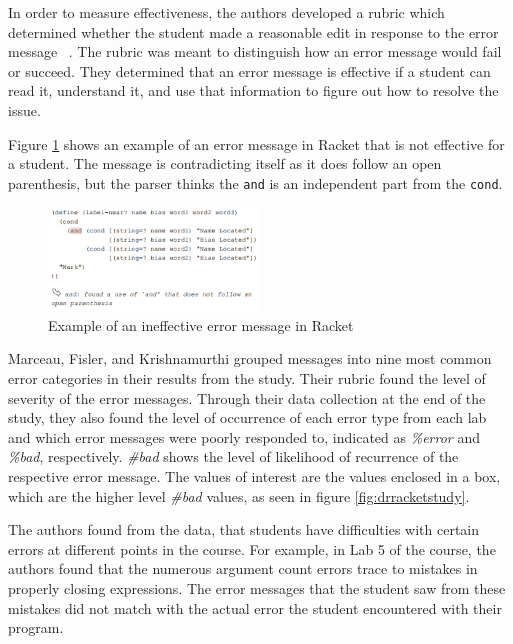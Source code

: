 \documentclass{sig-alternate}
\begin{document}
In order to measure effectiveness, the authors developed a rubric which determined whether the student made a reasonable edit in response to the error message ~\cite{Marceau:2011:MEE:1953163.1953308}. The rubric was meant to distinguish how an error message would fail or succeed. They determined that an error message is effective if a student can read it, understand it, and use that information to figure out how to resolve the issue. 

Figure \ref{fig:racketerrormessage} shows an example of an error message in Racket that is not effective for a student. The message is contradicting itself as it does follow an open parenthesis, but the parser thinks the \texttt{and} is an independent part from the \texttt{cond}.

\begin{figure}[t!]
  \centering
  \includegraphics[keepaspectratio, width=0.5\textwidth]{MEE_example.png}
  \caption{Example of an ineffective error message in Racket}
  \label{fig:racketerrormessage}
\end{figure}

Marceau, Fisler, and Krishnamurthi grouped messages into nine most common error categories in their results from the study. Their rubric found the level of severity of the error messages. Through their data collection at the end of the study, they also found the level of occurrence of each error type from each lab and which error messages were poorly responded to, indicated as \textit{\%error} and \textit{\%bad}, respectively. \textit{\#bad} shows the level of likelihood of recurrence of the respective error message. The values of interest are the values enclosed in a box, which are the higher level \textit{\#bad} values, as seen in figure \ref{fig:drracketstudy}. 

The authors found from the data, that students have difficulties with certain errors at different points in the course. For example, in Lab 5 of the course, the authors found that the numerous argument count errors trace to mistakes in properly closing expressions. The error messages that the student saw from these mistakes did not match with the actual error the student encountered with their program. 
\end{document}
